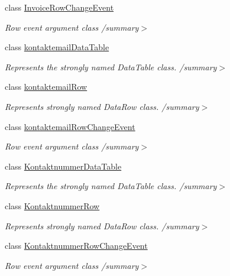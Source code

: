 \begin{DoxyCompactItemize}
class \hyperlink{class_products_1_1_data_1_1ds_sage_1_1_invoice_row_change_event}{Invoice\+Row\+Change\+Event}
\begin{DoxyCompactList}\small\item\em Row event argument class /summary$>$ \end{DoxyCompactList}\item 
class \hyperlink{class_products_1_1_data_1_1ds_sage_1_1kontaktemail_data_table}{kontaktemail\+Data\+Table}
\begin{DoxyCompactList}\small\item\em Represents the strongly named Data\+Table class. /summary$>$ \end{DoxyCompactList}\item 
class \hyperlink{class_products_1_1_data_1_1ds_sage_1_1kontaktemail_row}{kontaktemail\+Row}
\begin{DoxyCompactList}\small\item\em Represents strongly named Data\+Row class. /summary$>$ \end{DoxyCompactList}\item 
class \hyperlink{class_products_1_1_data_1_1ds_sage_1_1kontaktemail_row_change_event}{kontaktemail\+Row\+Change\+Event}
\begin{DoxyCompactList}\small\item\em Row event argument class /summary$>$ \end{DoxyCompactList}\item 
class \hyperlink{class_products_1_1_data_1_1ds_sage_1_1_kontaktnummer_data_table}{Kontaktnummer\+Data\+Table}
\begin{DoxyCompactList}\small\item\em Represents the strongly named Data\+Table class. /summary$>$ \end{DoxyCompactList}\item 
class \hyperlink{class_products_1_1_data_1_1ds_sage_1_1_kontaktnummer_row}{Kontaktnummer\+Row}
\begin{DoxyCompactList}\small\item\em Represents strongly named Data\+Row class. /summary$>$ \end{DoxyCompactList}\item 
class \hyperlink{class_products_1_1_data_1_1ds_sage_1_1_kontaktnummer_row_change_event}{Kontaktnummer\+Row\+Change\+Event}
\begin{DoxyCompactList}\small\item\em Row event argument class /summary$>$ \end{DoxyCompactList}\item 

\end{DoxyCompactItemize}
